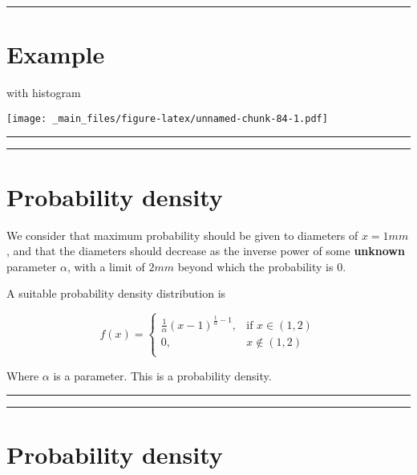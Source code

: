 \documentclass[
]{book}
\begin{document}
\begin{center}\rule{0.5\linewidth}{0.5pt}\end{center}

\hypertarget{example-16}{%
\section{Example}\label{example-16}}

with histogram

\texttt{[image: \_main\_files/figure-latex/unnamed-chunk-84-1.pdf]}

\begin{center}\rule{0.5\linewidth}{0.5pt}\end{center}

\begin{center}\rule{0.5\linewidth}{0.5pt}\end{center}

\hypertarget{probability-density}{%
\section{Probability density}\label{probability-density}}

We consider that maximum probability should be given to diameters of \(x=1mm\), and that the diameters should decrease as the inverse power of some \textbf{unknown} parameter \(\alpha\), with a limit of \(2mm\) beyond which the probability is \(0\).

A suitable probability density distribution is

\[
    f(x)= 
\begin{cases}
\frac{1}{\alpha}(x-1)^{\frac{1}{\alpha}-1},& \text{if } x \in (1,2)\\
    0,& x \notin (1,2)\\
\end{cases}
\]

Where \(\alpha\) is a parameter. This is a probability density.

\begin{center}\rule{0.5\linewidth}{0.5pt}\end{center}

\begin{center}\rule{0.5\linewidth}{0.5pt}\end{center}

\hypertarget{probability-density-1}{%
\section{Probability density}\label{probability-density-1}}
\end{document}
